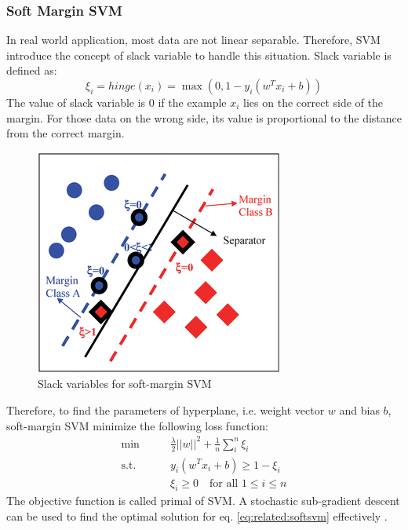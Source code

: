 \subsubsection{Soft Margin SVM}
In real world application, most data are not linear separable. Therefore, SVM introduce the concept of slack variable to handle this situation. Slack variable is defined as:
\begin{equation}
\xi_i  = hinge(x_i) = \max (0,1-y_i(w^Tx_i+b))
\end{equation}
The value of slack variable is 0 if the example $x_i$ lies on the correct side of the margin. For those data on the wrong side, its value is proportional to the distance from the correct margin.
\begin{figure}
	\centering
	\includegraphics[scale =1.2]{relatedwork/fig/slack.png}
	\caption{Slack variables for soft-margin SVM}
\end{figure}

Therefore, to find the parameters of hyperplane, i.e. weight vector $w$ and bias $b$, soft-margin SVM minimize the following loss function:
\begin{equation}\label{eq:related:softsvm}
	\begin{aligned}
	\min \qquad &  \frac{\lambda}{2}||w||^2+\frac{1}{n}\sum_{i}^{n}\xi_i\\
	\text{s.t.}\qquad & y_i(w^Tx_i+b) \geq 1-\xi_i \\
	& \xi_i \geq 0 	\quad \text{for all } 1\leq i \leq n
	\end{aligned}
\end{equation}
The objective function is called primal of SVM. A stochastic sub-gradient descent can be used to find the optimal solution for eq. \eqref{eq:related:softsvm} effectively \cite{shalev2011pegasos}. 
